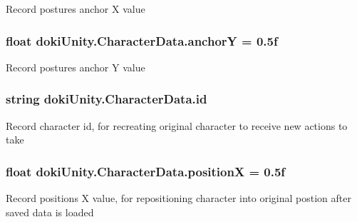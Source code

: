 Record posture\textquotesingle{}s anchor X value 

\subsubsection[{\texorpdfstring{anchorY}{anchorY}}]{\setlength{\rightskip}{0pt plus 5cm}float doki\+Unity.\+Character\+Data.\+anchorY = 0.\+5f}\hypertarget{classdoki_unity_1_1_character_data_a2051701b408778e685f524449be94ffd}{}\label{classdoki_unity_1_1_character_data_a2051701b408778e685f524449be94ffd}


Record posture\textquotesingle{}s anchor Y value 

\subsubsection[{\texorpdfstring{id}{id}}]{\setlength{\rightskip}{0pt plus 5cm}string doki\+Unity.\+Character\+Data.\+id}\hypertarget{classdoki_unity_1_1_character_data_a696154d979ff8edaf48cf252792ec823}{}\label{classdoki_unity_1_1_character_data_a696154d979ff8edaf48cf252792ec823}


Record character id, for recreating original character to receive new actions to take 

\subsubsection[{\texorpdfstring{positionX}{positionX}}]{\setlength{\rightskip}{0pt plus 5cm}float doki\+Unity.\+Character\+Data.\+positionX = 0.\+5f}\hypertarget{classdoki_unity_1_1_character_data_ab10c8f050cc28b91ad597c7085c6bf91}{}\label{classdoki_unity_1_1_character_data_ab10c8f050cc28b91ad597c7085c6bf91}


Record position\textquotesingle{}s X value, for repositioning character into original postion after saved data is loaded 

